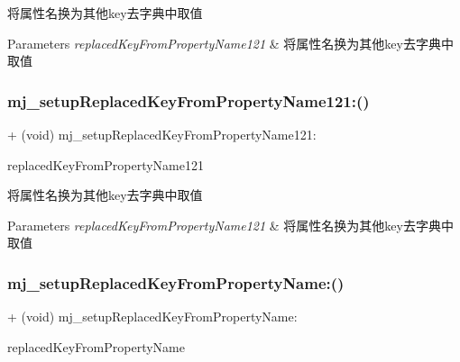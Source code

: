 将属性名换为其他key去字典中取值


\begin{DoxyParams}{Parameters}
{\em replaced\+Key\+From\+Property\+Name121} & 将属性名换为其他key去字典中取值 \\
\hline
\end{DoxyParams}
\mbox{\label{category_n_s_object_07_m_j_property_08_a65ca79a4eb9d05d554c0420b95afe471}} 
\subsubsection{\texorpdfstring{mj\+\_\+setup\+Replaced\+Key\+From\+Property\+Name121\+:()}{mj\_setupReplacedKeyFromPropertyName121:()}\hspace{0.1cm}{\footnotesize\ttfamily [3/3]}}
{\footnotesize\ttfamily + (void) mj\+\_\+setup\+Replaced\+Key\+From\+Property\+Name121\+: \begin{DoxyParamCaption}\item[{(M\+J\+Replaced\+Key\+From\+Property\+Name121)}]{replaced\+Key\+From\+Property\+Name121 }\end{DoxyParamCaption}}

将属性名换为其他key去字典中取值


\begin{DoxyParams}{Parameters}
{\em replaced\+Key\+From\+Property\+Name121} & 将属性名换为其他key去字典中取值 \\
\hline
\end{DoxyParams}
\mbox{\label{category_n_s_object_07_m_j_property_08_a1883e0f76733827afe0a1855d8bfb6f8}} 
\subsubsection{\texorpdfstring{mj\+\_\+setup\+Replaced\+Key\+From\+Property\+Name\+:()}{mj\_setupReplacedKeyFromPropertyName:()}\hspace{0.1cm}{\footnotesize\ttfamily [1/3]}}
{\footnotesize\ttfamily + (void) mj\+\_\+setup\+Replaced\+Key\+From\+Property\+Name\+: \begin{DoxyParamCaption}\item[{(M\+J\+Replaced\+Key\+From\+Property\+Name)}]{replaced\+Key\+From\+Property\+Name }\end{DoxyParamCaption}}

